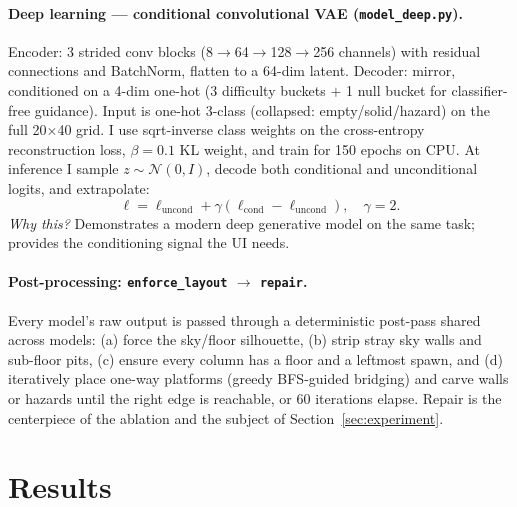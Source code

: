 \documentclass[11pt]{article}
\begin{document}
\paragraph{Deep learning --- conditional convolutional VAE
(\texttt{model\_deep.py}).}
Encoder: 3 strided conv blocks (8$\to$64$\to$128$\to$256 channels)
with residual connections and BatchNorm, flatten to a 64-dim latent.
Decoder: mirror, conditioned on a 4-dim one-hot (3 difficulty buckets
$+$ 1 null bucket for classifier-free guidance). Input is one-hot 3-class
(collapsed: empty/solid/hazard) on the full 20$\times$40 grid. I use
sqrt-inverse class weights on the cross-entropy reconstruction loss,
$\beta=0.1$ KL weight, and train for 150 epochs on CPU. At inference I
sample $z \sim \mathcal{N}(0, I)$, decode both conditional and
unconditional logits, and extrapolate:
\[
\ell = \ell_\text{uncond} + \gamma (\ell_\text{cond} - \ell_\text{uncond}), \quad \gamma = 2.
\]
\emph{Why this?} Demonstrates a modern deep generative model on the
same task; provides the conditioning signal the UI needs.

\paragraph{Post-processing: \texttt{enforce\_layout} $\to$ \texttt{repair}.}
Every model's raw output is passed through a deterministic post-pass
shared across models: (a) force the sky/floor silhouette, (b) strip
stray sky walls and sub-floor pits, (c) ensure every column has a
floor and a leftmost spawn, and (d) iteratively place one-way
platforms (greedy BFS-guided bridging) and carve walls or hazards
until the right edge is reachable, or 60 iterations elapse. Repair
is the centerpiece of the ablation and the subject of Section~\ref{sec:experiment}.

\section{Results}
\label{sec:results}
\end{document}
